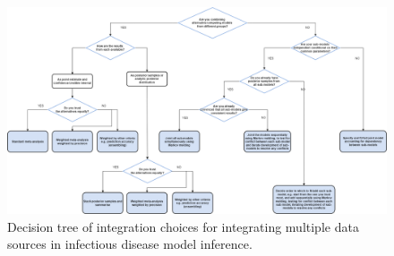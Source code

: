 \documentclass{article}
\begin{document}


\begin{figure}[htbp]
    \centering
    \includegraphics[width=\textwidth]{figures/integration choices decision tree.drawio (1).png}
    \caption{Decision tree of integration choices for integrating multiple data sources in infectious disease model inference.}
    \label{fig:integration}
\end{figure}
\end{document}
